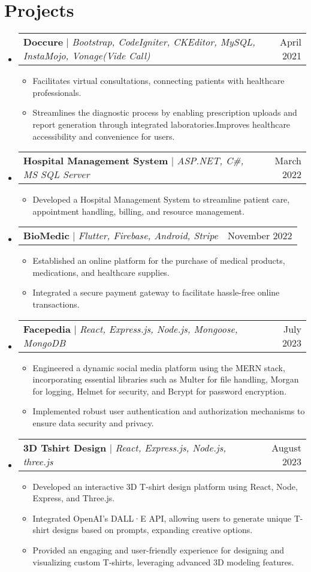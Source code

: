 \documentclass[letterpaper,11pt]{article}
\makeatletter
\newcommand{\resumeItem}[1]{
  \item\small{
    {#1 \vspace{-2pt}}
  }
}
\newcommand{\resumeSubSubheading}[2]{
    \item
    \begin{tabular*}{0.97\textwidth}{l@{\extracolsep{\fill}}r}
      \textit{\small#1} & \textit{\small #2} \\
    \end{tabular*}\vspace{-7pt}
}
\newcommand{\resumeProjectHeading}[2]{
 \vspace{-1pt}
    \item
    \begin{tabular*}{0.97\textwidth}{l@{\extracolsep{\fill}}r}
      \small#1 & #2 \\
    \end{tabular*}\vspace{-7pt}
}
\newcommand{\resumeSubHeadingListStart}{\begin{itemize}[leftmargin=0.05in, label={}]}
\newcommand{\resumeSubHeadingListEnd}{\end{itemize}}
\newcommand{\resumeItemListStart}{\begin{itemize}\vspace{2pt}}
\newcommand{\resumeItemListEnd}{\end{itemize}\vspace{-5pt}}
\makeatother
\begin{document}

\section{Projects}
    \resumeSubHeadingListStart
      \resumeProjectHeading
          {\textbf{Doccure} $|$ \emph{Bootstrap, CodeIgniter, CKEditor, MySQL, InstaMojo, Vonage(Vide Call)}}{April 2021}
          \resumeItemListStart
            \resumeItem{Facilitates virtual consultations, connecting patients with healthcare professionals.}
            \resumeItem{Streamlines the diagnostic process by enabling prescription uploads and report generation through integrated laboratories.Improves healthcare accessibility and convenience for users.}
          \resumeItemListEnd
          \resumeProjectHeading
          {\textbf{Hospital Management System} $|$ \emph{ASP.NET, C\#, MS SQL Server}}{March 2022}
          \resumeItemListStart
            \resumeItem{Developed a Hospital Management System to streamline patient care, appointment handling, billing, and resource management.}
          \resumeItemListEnd
        \resumeProjectHeading
          {\textbf{BioMedic} $|$ \emph{Flutter, Firebase, Android, Stripe}}{November 2022}
          \resumeItemListStart
            \resumeItem{Established an online platform for the purchase of medical products, medications, and healthcare supplies.}
            \resumeItem{Integrated a secure payment gateway to facilitate hassle-free online transactions.}
          \resumeItemListEnd
        \resumeProjectHeading
          {\textbf{Facepedia} $|$ \emph{React, Express.js, Node.js, Mongoose, MongoDB}}{July 2023}
          \resumeItemListStart
            \resumeItem{Engineered a dynamic social media platform using the MERN stack, incorporating essential libraries such as Multer for file handling, Morgan for logging, Helmet for security, and Bcrypt for password encryption.}
            \resumeItem{Implemented robust user authentication and authorization mechanisms to ensure data security and privacy.}
          \resumeItemListEnd
        \resumeProjectHeading
          {\textbf{3D Tshirt Design} $|$ \emph{React, Express.js, Node.js, three.js}}{August 2023}
          \resumeItemListStart
            \resumeItem{Developed an interactive 3D T-shirt design platform using React, Node, Express, and Three.js.}
            \resumeItem{Integrated OpenAI's DALL·E API, allowing users to generate unique T-shirt designs based on prompts, expanding creative options.}
            \resumeItem{Provided an engaging and user-friendly experience for designing and visualizing custom T-shirts, leveraging advanced 3D modeling features.}
          \resumeItemListEnd
    \resumeSubHeadingListEnd
\end{document}
